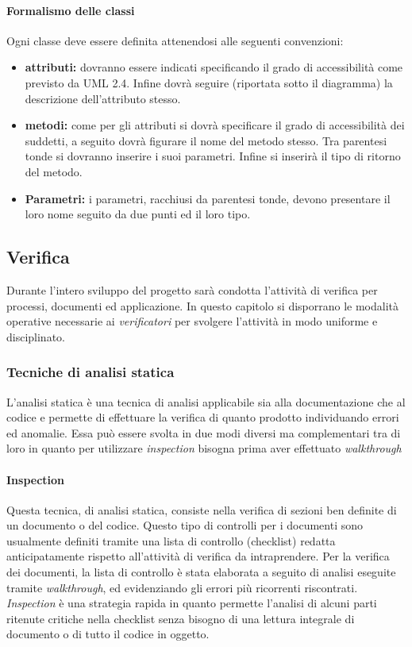 \paragraph{Formalismo delle classi}\begin{flushleft}
Ogni classe deve essere definita attenendosi alle seguenti convenzioni:
\end{flushleft}
\begin{itemize}
\item \textbf{attributi:} dovranno essere indicati specificando il grado di accessibilità come previsto da UML 2.4. Infine dovrà seguire (riportata sotto il diagramma) la descrizione dell'attributo stesso.
\item \textbf{metodi:} come per gli attributi si dovrà specificare il grado di accessibilità dei suddetti, a seguito dovrà figurare il nome del metodo stesso. Tra parentesi tonde si dovranno inserire i suoi parametri. Infine si inserirà il tipo di ritorno del metodo.
\item \textbf{Parametri:} i parametri, racchiusi da parentesi tonde, devono presentare il loro nome seguito da due punti ed il loro tipo.
\end{itemize}

\subsection{Verifica}
Durante l'intero sviluppo del progetto sarà condotta l'attività di verifica per processi, documenti ed applicazione.
In questo capitolo si disporrano le modalità operative necessarie ai \textit{verificatori} per svolgere l'attività in modo uniforme e disciplinato.

\subsubsection{Tecniche di analisi statica}
L'analisi statica è una tecnica di analisi applicabile sia alla documentazione che al codice e permette di effettuare la verifica di quanto prodotto individuando errori ed anomalie. Essa può essere svolta in due modi diversi ma complementari tra di loro in quanto per utilizzare \textit{inspection} bisogna prima aver effettuato \textit{walkthrough}
\paragraph{Inspection}
Questa tecnica, di analisi statica, consiste nella verifica di sezioni ben definite di un documento o del codice. Questo tipo di controlli per i documenti sono usualmente definiti tramite una lista di controllo (checklist) redatta anticipatamente rispetto all'attività di verifica da intraprendere. Per la verifica dei documenti, la lista di controllo è stata elaborata a seguito di analisi eseguite tramite \textit{walkthrough}, ed evidenziando gli errori più ricorrenti riscontrati. \textit{Inspection} è una strategia rapida in quanto permette l'analisi di alcuni parti ritenute critiche nella checklist senza bisogno di una lettura integrale di documento o di tutto il codice in oggetto.
